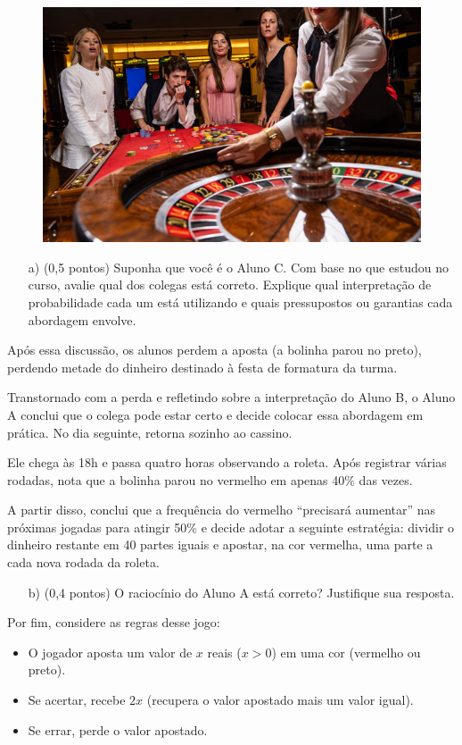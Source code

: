 \documentclass[12pt]{article}
\begin{document}
  \begin{figure}[H]
        \centering
        \includegraphics[width=0.6\linewidth]{figures/roleta.jpg}
    \end{figure}


\begin{enumerate}[label=\alph*), resume]
    \item[a)] (0,5 pontos) Suponha que você é o Aluno C. Com base no que estudou no curso, avalie qual dos colegas está correto. Explique qual interpretação de probabilidade cada um está utilizando e quais pressupostos ou garantias cada abordagem envolve.
\end{enumerate}

Após essa discussão, os alunos perdem a aposta (a bolinha parou no preto), perdendo metade do dinheiro destinado à festa de formatura da turma.

Transtornado com a perda e refletindo sobre a interpretação do Aluno B, o Aluno A conclui que o colega pode estar certo e decide colocar essa abordagem em prática. No dia seguinte, retorna sozinho ao cassino.

Ele chega às 18h e passa quatro horas observando a roleta. Após registrar várias rodadas, nota que a bolinha parou no vermelho em apenas 40\% das vezes.

A partir disso, conclui que a frequência do vermelho ``precisará aumentar'' nas próximas jogadas para atingir 50\% e decide adotar a seguinte estratégia: dividir o dinheiro restante em 40 partes iguais e apostar, na cor vermelha, uma parte a cada nova rodada da roleta.

\begin{enumerate}[label=\alph*), resume]
    \item[b)] (0,4 pontos) O raciocínio do Aluno A está correto? Justifique sua resposta.
\end{enumerate}

Por fim, considere as regras desse jogo:

\begin{itemize}
    \item O jogador aposta um valor de $x$ reais ($x>0$) em uma cor (vermelho ou preto).
    \item Se acertar, recebe $2x$ (recupera o valor apostado mais um valor igual).
    \item Se errar, perde o valor apostado.
\end{itemize}
\end{document}
